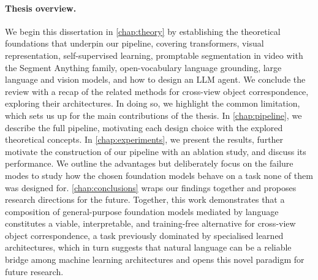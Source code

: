 \paragraph{Thesis overview.} We begin this dissertation in \cref{chap:theory} by establishing the theoretical foundations that underpin our pipeline, covering transformers, visual representation, self-supervised
learning, promptable segmentation in video with the Segment Anything family, open-vocabulary language grounding, large language and vision models, and how to design an LLM agent. We conclude the review with a
recap of the related methods for cross-view object correspondence, exploring their architectures. In doing so, we highlight the common limitation, which sets us up for the main contributions of the thesis. In
\cref{chap:pipeline}, we describe the full pipeline, motivating each design choice with the explored theoretical concepts. In \cref{chap:experiments}, we present the results, further motivate the construction of
our pipeline with an ablation study, and discuss its performance. We outline the advantages but deliberately focus on the failure modes to study how the chosen foundation models behave on a task none of them
was designed for. \cref{chap:conclusions} wraps our findings together and proposes research directions for the future. Together, this work demonstrates that a composition of general-purpose foundation models mediated by language constitutes a viable, interpretable, and training-free alternative for cross-view
object correspondence, a task previously dominated by specialised learned architectures, which in turn suggests that natural language can be a reliable bridge among machine learning architectures and opens this
novel paradigm for future research.